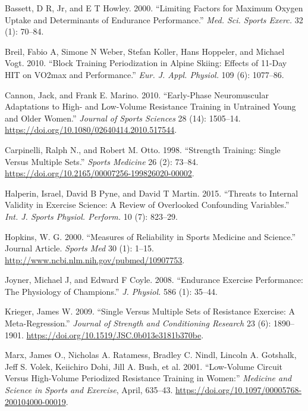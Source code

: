 \documentclass[
  letterpaper,
  DIV=11,
  numbers=noendperiod]{scrreprt}
\newlength{\cslhangindent}
\newenvironment{CSLReferences}[2] %
 {\begin{list}{}{%
  \setlength{\itemindent}{0pt}
  \setlength{\leftmargin}{0pt}
  \setlength{\parsep}{0pt}
  \ifodd #1
   \setlength{\leftmargin}{\cslhangindent}
   \setlength{\itemindent}{-1\cslhangindent}
  \fi
  \setlength{\itemsep}{#2\baselineskip}}}
 {\end{list}}
\begin{document}
\label{refs}
\begin{CSLReferences}{1}{0}
Bassett, D R, Jr, and E T Howley. 2000. {``Limiting Factors for Maximum
Oxygen Uptake and Determinants of Endurance Performance.''} \emph{Med.
Sci. Sports Exerc.} 32 (1): 70--84.

Breil, Fabio A, Simone N Weber, Stefan Koller, Hans Hoppeler, and
Michael Vogt. 2010. {``Block Training Periodization in Alpine Skiing:
Effects of 11-Day {HIT} on {VO2max} and Performance.''} \emph{Eur. J.
Appl. Physiol.} 109 (6): 1077--86.

Cannon, Jack, and Frank E. Marino. 2010. {``Early-Phase Neuromuscular
Adaptations to High- and Low-Volume Resistance Training in Untrained
Young and Older Women.''} \emph{Journal of Sports Sciences} 28 (14):
1505--14. \url{https://doi.org/10.1080/02640414.2010.517544}.

Carpinelli, Ralph N., and Robert M. Otto. 1998. {``Strength Training:
Single Versus Multiple Sets.''} \emph{Sports Medicine} 26 (2): 73--84.
\url{https://doi.org/10.2165/00007256-199826020-00002}.

Halperin, Israel, David B Pyne, and David T Martin. 2015. {``Threats to
Internal Validity in Exercise Science: A Review of Overlooked
Confounding Variables.''} \emph{Int. J. Sports Physiol. Perform.} 10
(7): 823--29.

Hopkins, W. G. 2000. {``Measures of Reliability in Sports Medicine and
Science.''} Journal Article. \emph{Sports Med} 30 (1): 1--15.
\url{http://www.ncbi.nlm.nih.gov/pubmed/10907753}.

Joyner, Michael J, and Edward F Coyle. 2008. {``Endurance Exercise
Performance: The Physiology of Champions.''} \emph{J. Physiol.} 586 (1):
35--44.

Krieger, James W. 2009. {``Single Versus Multiple Sets of Resistance
Exercise: A Meta-Regression.''} \emph{Journal of Strength and
Conditioning Research} 23 (6): 1890--1901.
\url{https://doi.org/10.1519/JSC.0b013e3181b370be}.

Marx, James O., Nicholas A. Ratamess, Bradley C. Nindl, Lincoln A.
Gotshalk, Jeff S. Volek, Keiichiro Dohi, Jill A. Bush, et al. 2001.
{``Low-Volume Circuit Versus High-Volume Periodized Resistance Training
in Women:''} \emph{Medicine and Science in Sports and Exercise}, April,
635--43. \url{https://doi.org/10.1097/00005768-200104000-00019}.


\end{CSLReferences}
\end{document}
